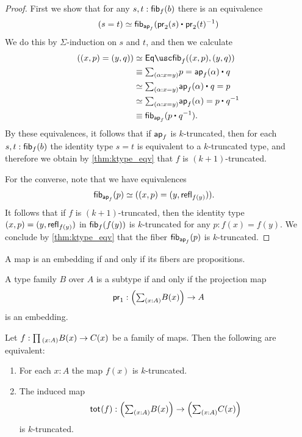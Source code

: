 \begin{proof}
First we show that for any $s,t:\mathsf{fib}_{f}(b)$ there is an equivalence
\begin{equation*}
\eqv{(s=t)}{\fib{\apfunc{f}}{\ct{\proj 2(s)}{\proj 2(t)^{-1}}}}
\end{equation*}
We do this by $\Sigma$-induction on $s$ and $t$, and then we calculate
\begin{align*}
(\pairr{x,p}=\pairr{y,q}) & \eqvsym \Eqfib_f((x,p),(y,q)) \\
  & \jdeq \sm{\alpha:x=y} p=\ct{\ap{f}{\alpha}}{q} \\
  & \eqvsym \sm{\alpha:x=y} \ct{\ap{f}{\alpha}}{q}=p \\
& \eqvsym \sm{\alpha:x=y} \ap{f}{\alpha}=\ct{p}{q^{-1}} \\
& \jdeq \fib{\apfunc{f}}{\ct{p}{q^{-1}}}.
\end{align*}
By these equivalences, it follows that if $\mathsf{ap}_{f}$ is $k$-truncated, then for each $s,t:\mathsf{fib}_{f}(b)$ the identity type $s=t$ is equivalent to a $k$-truncated type, and therefore we obtain by \cref{thm:ktype_eqv} that $f$ is $(k+1)$-truncated.

For the converse, note that we have equivalences
\begin{align*}
\mathsf{fib}_{\mathsf{ap}_{f}}(p) & \simeq ((x,p)=(y,\mathsf{refl}_{f(y)})).
\end{align*}
It follows that if $f$ is $(k+1)$-truncated, then the identity type $(x,p)=(y,\mathsf{refl}_{f(y)})$ in $\mathsf{fib}_{f}(f(y))$ is $k$-truncated for any $p:f(x)=f(y)$. We conclude by \cref{thm:ktype_eqv} that the fiber $\mathsf{fib}_{\mathsf{ap}_{f}}(p)$ is $k$-truncated. 
\end{proof}

\begin{cor}\label{cor:prop_emb}
A map is an embedding if and only if its fibers are propositions.
\end{cor}

\begin{cor}\label{thm:subtype}
A type family $B$ over $A$ is a subtype if and only if the projection map
\begin{equation*}
\proj 1 : \Big(\sm{x:A}B(x)\Big)\to A
\end{equation*}
is an embedding.
\end{cor}

\begin{thm}
Let $f:\prd{x:A}B(x)\to C(x)$ be a family of maps. Then the following are equivalent:
\begin{enumerate}
\item For each $x:A$ the map $f(x)$ is $k$-truncated.
\item The induced map 
\begin{equation*}
\tot{f}:\Big(\sm{x:A}B(x)\Big)\to\Big(\sm{x:A}C(x)\Big)
\end{equation*}
is $k$-truncated.
\end{enumerate}
\end{thm}

